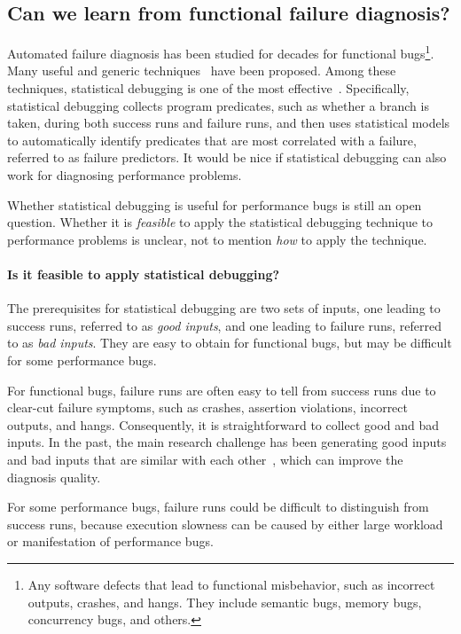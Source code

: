 \subsection{Can we learn from functional failure diagnosis?}
\label{sec:canwe}
Automated failure diagnosis has been studied for decades for functional 
bugs\footnote{Any software defects that lead to functional misbehavior,
such as incorrect outputs, crashes, and hangs. They include
semantic bugs, memory bugs, concurrency bugs, and others.}. 
Many useful and generic techniques~\citep{horwitz, xiangyu.ase05, delta,liblit03,CCI,tarantula1} have been proposed.
Among these techniques,
statistical debugging is one of the most effective~\citep{liblit03,CCI,tarantula1}. 
Specifically, statistical debugging
collects program predicates, such as
whether a branch is taken, during both success runs and failure runs, and
then uses
statistical models to automatically identify predicates that are most
correlated with a failure, referred to as failure predictors.
It would be nice if statistical debugging can also work for diagnosing
performance problems.

Whether statistical debugging is useful for performance bugs is 
still an open question. Whether it is \textit{feasible} to apply
the statistical debugging technique to performance problems is unclear, 
not to mention 
\textit{how} to apply the technique.

\paragraph{Is it feasible to apply statistical debugging?}
The prerequisites for statistical debugging are two sets of inputs, one
leading to success runs, referred to as \emph{good inputs}, and one leading to 
failure runs, referred to as \emph{bad inputs}.
They are easy to obtain for functional bugs, but may be difficult for some
performance bugs.

For functional bugs, failure runs are often easy to tell from success runs 
due to clear-cut failure symptoms, such as 
crashes, assertion violations, incorrect outputs, and hangs. Consequently, 
it is straightforward to collect good and bad inputs. 
In the past, the main research challenge has been generating good inputs and 
bad inputs
that are similar with each other~\citep{delta}, which can improve the diagnosis
quality.

For some performance bugs, failure runs could be difficult to distinguish
from success runs, because execution slowness can be
caused by either large workload or manifestation of performance bugs.

